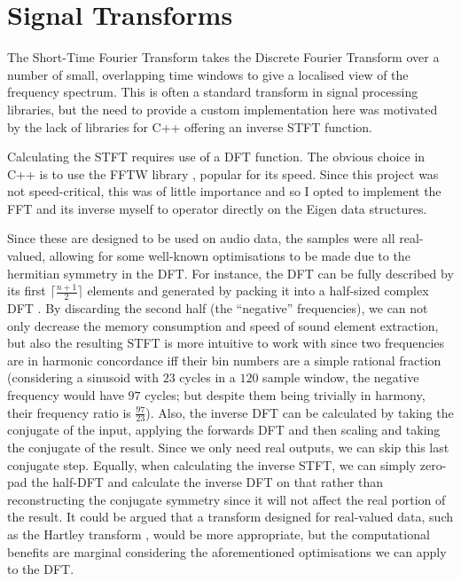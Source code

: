 \documentclass[12pt,a4paper,twoside,openright]{report}
\begin{document}
\section{Signal Transforms}

The Short-Time Fourier Transform takes the Discrete Fourier Transform over a number of small, overlapping time windows to give a localised view of the frequency spectrum. This is often a standard transform in signal processing libraries, but the need to provide a custom implementation here was motivated by the lack of libraries for C++ offering an inverse STFT function.

Calculating the STFT requires use of a DFT function. The obvious choice in C++ is to use the FFTW library \cite{fftw}, popular for its speed. Since this project was not speed-critical, this was of little importance and so I opted to implement the FFT and its inverse myself to operator directly on the Eigen data structures.

Since these are designed to be used on audio data, the samples were all real-valued, allowing for some well-known optimisations to be made due to the hermitian symmetry in the DFT. For instance, the DFT can be fully described by its first $ \lceil \frac{n+1}{2} \rceil $ elements and generated by packing it into a half-sized complex DFT \cite{sorensen1987real}. By discarding the second half (the ``negative'' frequencies), we can not only decrease the memory consumption and speed of sound element extraction, but also the resulting STFT is more intuitive to work with since two frequencies are in harmonic concordance iff their bin numbers are a simple rational fraction (considering a sinusoid with $ 23 $ cycles in a $ 120 $ sample window, the negative frequency would have $ 97 $ cycles; but despite them being trivially in harmony, their frequency ratio is $ \frac{97}{23} $). Also, the inverse DFT can be calculated by taking the conjugate of the input, applying the forwards DFT and then scaling and taking the conjugate of the result. Since we only need real outputs, we can skip this last conjugate step. Equally, when calculating the inverse STFT, we can simply zero-pad the half-DFT and calculate the inverse DFT on that rather than reconstructing the conjugate symmetry since it will not affect the real portion of the result. It could be argued that a transform designed for real-valued data, such as the Hartley transform \cite{hartley1942more}, would be more appropriate, but the computational benefits are marginal considering the aforementioned optimisations we can apply to the DFT.
\end{document}
